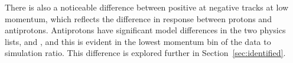 There is also a noticeable difference between positive at negative tracks at low momentum, which reflects the difference in response between protons and antiprotons.
Antiprotons have significant model differences in the two physics lists, \QGSP and \FTFP, and this is evident in the lowest momentum bin of the data to simulation ratio.
This difference is explored further in Section~\ref{sec:identified}.


\begin{figure}[htbp]
\centering
{}
~
\\
\end{figure}
